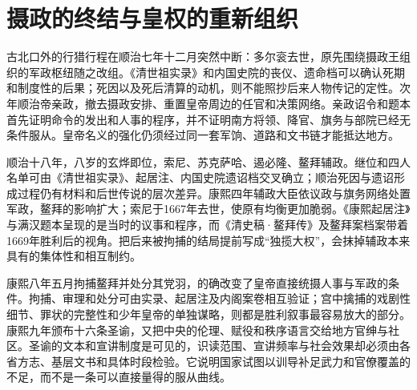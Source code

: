 \section{摄政的终结与皇权的重新组织}

古北口外的行猎行程在顺治七年十二月突然中断：多尔衮去世，原先围绕摄政王组织的军政枢纽随之改组。《清世祖实录》和内国史院的丧仪、遗命档可以确认死期和制度性的后果；死因以及死后清算的动机，则不能照抄后来人物传记的定性。次年顺治帝亲政，撤去摄政安排、重置皇帝周边的任官和决策网络。亲政诏令和题本首先证明命令的发出和人事的程序，并不证明南方将领、降官、旗务与部院已经无条件服从。皇帝名义的强化仍须经过同一套军饷、道路和文书链才能抵达地方。

顺治十八年，八岁的玄烨即位，索尼、苏克萨哈、遏必隆、鳌拜辅政。继位和四人名单可由《清世祖实录》、起居注、内国史院遗诏档交叉确立；顺治死因与遗诏形成过程仍有材料和后世传说的层次差异。康熙四年辅政大臣依议政与旗务网络处置军政，鳌拜的影响扩大；索尼于1667年去世，使原有均衡更加脆弱。《康熙起居注》与满汉题本呈现的是当时的议事和程序，而《清史稿·鳌拜传》及鳌拜案档案带着1669年胜利后的视角。把后来被拘捕的结局提前写成“独揽大权”，会抹掉辅政本来具有的集体性和相互制约。

康熙八年五月拘捕鳌拜并处分其党羽，的确改变了皇帝直接统摄人事与军政的条件。拘捕、审理和处分可由实录、起居注及内阁案卷相互验证；宫中擒捕的戏剧性细节、罪状的完整性和少年皇帝的单独谋略，则都是胜利叙事最容易放大的部分。康熙九年颁布十六条圣谕，又把中央的伦理、赋役和秩序语言交给地方官绅与社区。圣谕的文本和宣讲制度是可见的，识读范围、宣讲频率与社会效果却必须由各省方志、基层文书和具体时段检验。它说明国家试图以训导补足武力和官僚覆盖的不足，而不是一条可以直接量得的服从曲线。
